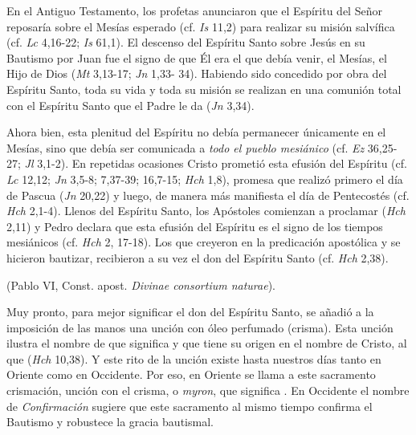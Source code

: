 \begin{ccebody}
 En el Antiguo Testamento, los profetas anunciaron que el Espíritu del Señor reposaría sobre el Mesías esperado (cf. \textit{Is} 11,2) para realizar su misión salvífica (cf. \textit{Lc} 4,16-22; \textit{Is} 61,1). El descenso del Espíritu Santo sobre Jesús en su Bautismo por Juan fue el signo de que Él era el que debía venir, el Mesías, el Hijo de Dios (\textit{Mt} 3,13-17; \textit{Jn} 1,33- 34). Habiendo sido concedido por obra del Espíritu Santo, toda su vida y toda su misión se realizan en una comunión total con el Espíritu Santo que el Padre le da  (\textit{Jn} 3,34).

 Ahora bien, esta plenitud del Espíritu no debía permanecer únicamente en el Mesías, sino que debía ser comunicada a \textit{todo el pueblo mesiánico} (cf. \textit{Ez} 36,25-27; \textit{Jl} 3,1-2). En repetidas ocasiones Cristo prometió esta efusión del Espíritu (cf. \textit{Lc} 12,12; \textit{Jn} 3,5-8; 7,37-39; 16,7-15; \textit{Hch} 1,8), promesa que realizó primero el día de Pascua (\textit{Jn} 20,22) y luego, de manera más manifiesta el día de Pentecostés (cf. \textit{Hch} 2,1-4). Llenos del Espíritu Santo, los Apóstoles comienzan a proclamar  (\textit{Hch} 2,11) y Pedro declara que esta efusión del Espíritu es el signo de los tiempos mesiánicos (cf. \textit{Hch} 2, 17-18). Los que creyeron en la predicación apostólica y se hicieron bautizar, recibieron a su vez el don del Espíritu Santo (cf. \textit{Hch} 2,38).

  (Pablo VI, Const. apost. \textit{Divinae consortium naturae}).

 Muy pronto, para mejor significar el don del Espíritu Santo, se añadió a la imposición de las manos una unción con óleo perfumado (crisma). Esta unción ilustra el nombre de  que significa  y que tiene su origen en el nombre de Cristo, al que  (\textit{Hch} 10,38). Y este rito de la unción existe hasta nuestros días tanto en Oriente como en Occidente. Por eso, en Oriente se llama a este sacramento crismación, unción con el crisma, o \textit{myron}, que significa . En Occidente el nombre de \textit{Confirmación} sugiere que este sacramento al mismo tiempo confirma el Bautismo y robustece la gracia bautismal.
\end{ccebody}

